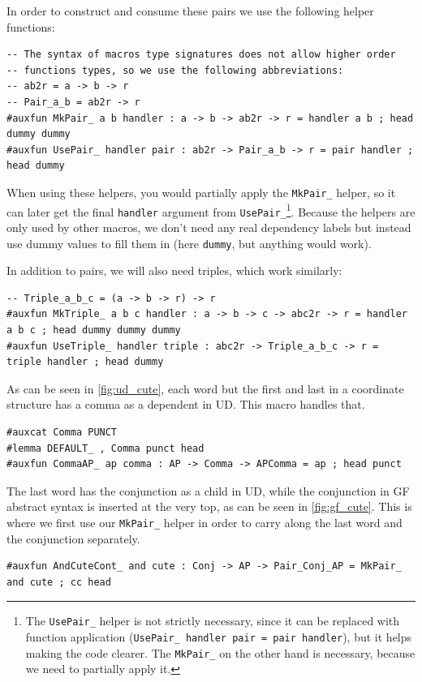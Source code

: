 In order to construct and consume these pairs we use the following helper functions:
\begin{lstlisting}
-- The syntax of macros type signatures does not allow higher order
-- functions types, so we use the following abbreviations:
-- ab2r = a -> b -> r
-- Pair_a_b = ab2r -> r
#auxfun MkPair_ a b handler : a -> b -> ab2r -> r = handler a b ; head dummy dummy
#auxfun UsePair_ handler pair : ab2r -> Pair_a_b -> r = pair handler ; head dummy
\end{lstlisting}
When using these helpers, you would partially apply the \verb|MkPair_| helper, so it can later get the final \verb|handler| argument from \verb|UsePair_|\footnote{The \texttt{UsePair\_} helper is not strictly necessary, since it can be replaced with function application (\texttt{UsePair\_ handler pair = pair handler}), but it helps making the code clearer. The \texttt{MkPair\_} on the other hand is necessary, because we need to partially apply it.}.
Because the helpers are only used by other macros, we don't need any real dependency labels but instead use dummy values to fill them in (here \texttt{dummy}, but anything would work).



In addition to pairs, we will also need triples, which work similarly:
\begin{lstlisting}
-- Triple_a_b_c = (a -> b -> r) -> r
#auxfun MkTriple_ a b c handler : a -> b -> c -> abc2r -> r = handler a b c ; head dummy dummy dummy
#auxfun UseTriple_ handler triple : abc2r -> Triple_a_b_c -> r = triple handler ; head dummy
\end{lstlisting}

As can be seen in \autoref{fig:ud_cute}, each word but the first and last in a coordinate structure has a comma as a dependent in UD. This macro handles that.
\begin{lstlisting}
#auxcat Comma PUNCT
#lemma DEFAULT_ , Comma punct head
#auxfun CommaAP_ ap comma : AP -> Comma -> APComma = ap ; head punct
\end{lstlisting}

The last word has the conjunction as a child in UD, while the conjunction in GF abstract syntax is inserted at the very top, as can be seen in \autoref{fig:gf_cute}. This is where we first use our \verb|MkPair_| helper in order to carry along the last word and the conjunction separately.
\begin{lstlisting}
#auxfun AndCuteCont_ and cute : Conj -> AP -> Pair_Conj_AP = MkPair_ and cute ; cc head
\end{lstlisting}

